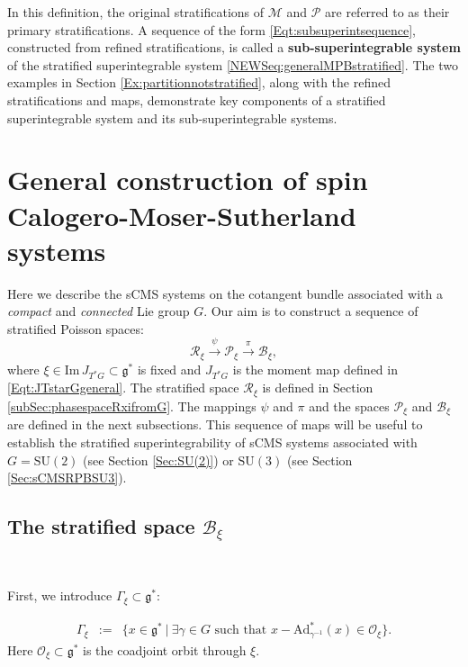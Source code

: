 \documentclass[12pt]{amsart}
\theoremstyle{definition}
\numberwithin{equation}{section}
\def\Im{\mathrm{Im}\,}
\newcommand{\SU}{\mathrm{SU}}
\newcommand{\gstar}{\mathfrak{g}^*}
\newcommand{\Oxi}{\mathcal{O}_{\xi}}
\newcommand{\Reducedxi}{\mathcal{R}_\xi}
\newcommand{\SET}[1]{\{#1\}}
\newcommand{\Pxi}{\mathcal{P}_{\xi}}
\newcommand{\Bxi}{\mathcal{B}_{\xi}}
\newcommand{\Adjointaction}{\mathrm{Ad}}
\begin{document}
    
    
 In this definition, the original stratifications of \(\mathcal{M}\) and \(\mathcal{P}\) are referred to as their primary stratifications. A sequence of the form \eqref{Eqt:subsuperintsequence}, constructed from refined stratifications, is called a \textbf{sub-superintegrable system} of the stratified superintegrable system \eqref{NEWSeq:generalMPBstratified}.  The two examples in Section \ref{Ex:partitionnotstratified}, along with the refined stratifications and maps, demonstrate key components of a stratified superintegrable system and its sub-superintegrable systems.




	\section{General construction of spin Calogero-Moser-Sutherland  systems}\label{sCMS}
	
	Here we   describe the  sCMS  systems on the cotangent bundle associated with a \textit{compact} and \textit{connected}   Lie group $G$.
 Our aim is to   construct a  sequence of stratified Poisson spaces:
	\[
	\Reducedxi  \stackrel{\psi}{\longrightarrow} \Pxi \stackrel{\pi}{\longrightarrow} \Bxi ,
	\]
	where $\xi \in \Im J_{T^*G}\subset \gstar$ is fixed and $J_{T^*G}$ is the moment map defined in \eqref{Eqt:JTstarGgeneral}. The stratified space $\Reducedxi$ is defined in Section \ref{subSec:phasespaceRxifromG}. The mappings $\psi$ and $\pi$ and the spaces $\Pxi$ and $\Bxi$ are defined in the next subsections. This sequence of maps will be useful to establish the stratified superintegrability of sCMS systems associated with   $G=\SU(2)$ (see Section \ref{Sec:SU(2)}) or $\SU(3)$ (see Section \ref{Sec:sCMSRPBSU3}).
	
	\subsection{The stratified    space  $\Bxi$}\label{subsubSec:Bxi}~
	
First, we introduce $\Gamma_{\xi}\subset \gstar$:
		
		\begin{eqnarray*}
			\Gamma_{\xi} &:=& \SET{x \in \gstar ~|~ \exists \gamma \in G \mbox{ such that } x - \Adjointaction^*_{\gamma^{-1}}(x) \in \Oxi}.  
		\end{eqnarray*} Here $\mathcal{O}_{\xi} \subset \gstar$ is the coadjoint orbit through $\xi$. 
		
\end{document}
